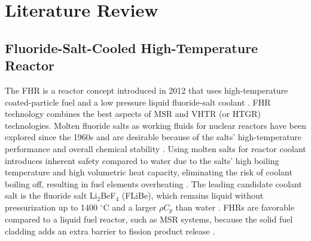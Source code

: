 \chapter{Literature Review}

\section{Fluoride-Salt-Cooled High-Temperature Reactor}
The \gls{FHR} is a reactor concept introduced in 2012 that uses high-temperature 
coated-particle fuel and a low pressure liquid fluoride-salt coolant 
\cite{forsberg_fluoride-salt-cooled_2012,facilitators_fluoride-salt-cooled_2013}.
\gls{FHR} technology combines the best aspects of \gls{MSR} and \gls{VHTR} 
(or \gls{HTGR}) technologies. 
Molten fluoride salts as working fluids for nuclear reactors have been explored 
since the 1960s and are desirable because of the salts' high-temperature 
performance and overall chemical stability \cite{scarlat_design_2014}.  
Using molten salts for reactor coolant introduces inherent safety compared 
to water due to the salts' high boiling temperature and high volumetric 
heat capacity, eliminating the risk of coolant boiling off, resulting in 
fuel elements overheating \cite{ho_molten_2013}. 
The leading candidate coolant salt is the fluoride salt Li$_2$BeF$_4$ (FLiBe), 
which remains liquid without pressurization up to 1400 $^{\circ}$C and a larger 
$\rho C_p$ than water \cite{ho_molten_2013,forsberg_fluoride-salt-cooled_2012}. 
\glspl{FHR} are favorable compared to a liquid fuel reactor, such as
\gls{MSR} systems, because the solid fuel cladding adds an extra barrier to fission 
product release 
\cite{ho_molten_2013}.

